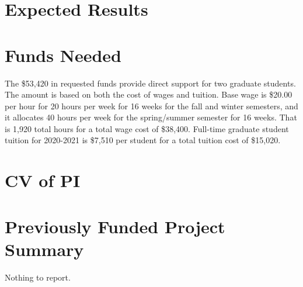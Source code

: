 \documentclass[11pt,onecolumn,notitlepage]{article}
\begin{document}
\section*{Expected Results}


\section*{Funds Needed}

The \$53,420 in requested funds provide direct support for two graduate students. The amount is based on both the cost of wages and tuition. Base wage is \$20.00 per hour for 20 hours per week for 16 weeks for the fall and winter semesters, and it allocates 40 hours per week for the spring/summer semester for 16 weeks. That is 1,920 total hours for a total wage cost of \$38,400. Full-time graduate student tuition for 2020-2021 is \$7,510 per student for a total tuition cost of \$15,020. 

\appendix
\appendixpage




\section{CV of PI}

\section{Previously Funded Project Summary}
Nothing to report.
\end{document}
